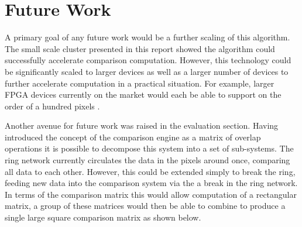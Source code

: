 \chapter{Future Work}
\renewcommand{\baselinestretch}{\mystretch}
\label{chap:futurework}

A primary goal of any future work would be a further scaling of this algorithm. The small scale cluster presented in this report showed the algorithm could successfully accelerate comparison computation. However, this technology could be significantly scaled to larger devices as well as a larger number of devices to further accelerate computation in a practical situation. For example, larger FPGA devices currently on the market would each be able to support on the order of a hundred pixels \cite{altcyc}.


Another avenue for future work was raised in the evaluation section. Having introduced the concept of the comparison engine as a matrix of overlap operations it is possible to decompose this system into a set of sub-systems. The ring network currently circulates the data in the pixels around once, comparing all data to each other. However, this could be extended simply to break the ring, feeding new data into the comparison system via the a break in the ring network. In terms of the comparison matrix this would allow computation of a rectangular matrix, a group of these matrices would then be able to combine to produce a single large square comparison matrix as shown below. 


